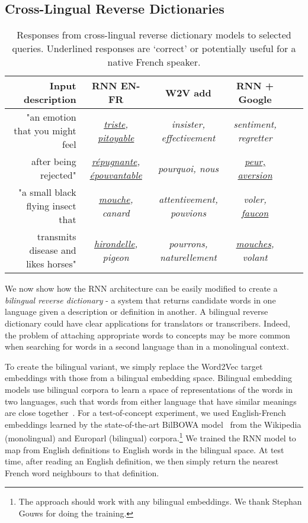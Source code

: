   
\subsection{Cross-Lingual Reverse Dictionaries}

\begin{table*}[ht]
{\small
\emph
\hfill{}
\begin{tabular}{r|ccccc|}
\bf Input description & \bf RNN EN-FR & \bf W2V add &  \bf RNN + Google  \\
\hline
  "an emotion that you might feel & \emph{ \underline{triste}, \underline{pitoyable}} & \emph {insister, effectivement} & \emph{ sentiment, regretter} \\


after being rejected" & \emph{ \underline{r\'epugnante}, \underline{\'epouvantable}} & \emph{pourquoi, nous} &\emph{  \underline{peur, aversion} } \\
\rule{0pt}{3ex} 
"a small black flying insect that  & \emph{\underline{mouche}, canard} & \emph {attentivement, pouvions} & \emph{ voler, \underline{faucon}} \\ 
transmits disease and likes horses" &  \emph{  \underline{hirondelle}, pigeon} & \emph{pourrons, naturellement} & \emph{\underline{mouches}, volant} \\
\end{tabular}}
\hfill{}
\caption{Responses from cross-lingual reverse dictionary models to selected queries. Underlined responses are `correct' or potentially useful for a native French speaker.}
\label{cross}
\end{table*}


We now show how the RNN architecture can be easily modified to create a \emph{bilingual reverse dictionary} - a system that returns candidate words in one language given a description or definition in another. A bilingual reverse dictionary could have clear applications for translators or transcribers. Indeed, the problem of attaching appropriate words to concepts may be more common when searching for words in a  second language than in a monolingual context.  

To create the bilingual variant, we simply replace the Word2Vec target embeddings with those from a bilingual embedding space. Bilingual embedding models use bilingual corpora to learn a space of representations of the words in two languages, such that words from either language that have similar meanings are close together~\cite{hermann2013multilingual,lauly2014autoencoder,gouws2014bilbowa}. For a test-of-concept experiment, we used English-French embeddings learned by the state-of-the-art BilBOWA model~\cite{gouws2014bilbowa} from the Wikipedia (monolingual) and Europarl (bilingual) corpora.\footnote{The approach should work with any bilingual embeddings. We thank Stephan Gouws for doing the training.} We trained the RNN model to map from English definitions to English words in the bilingual space. At test time, after reading an English definition, we then simply return the nearest French word neighbours to that definition.  

